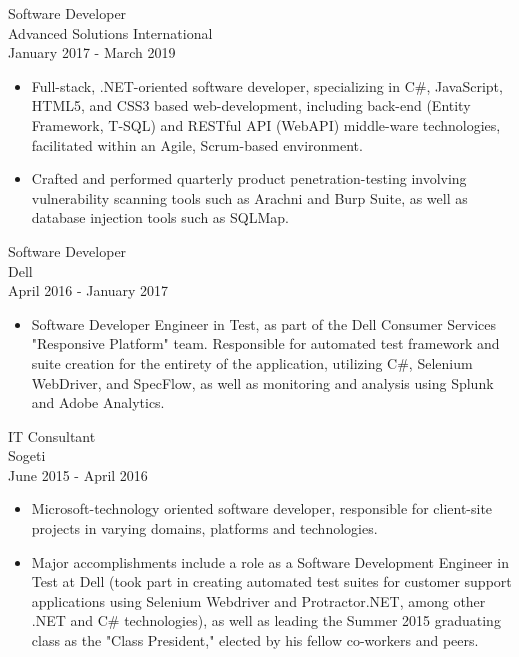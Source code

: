 \documentclass[11pt]{res} %
\begin{document}
\begin{resume}
Software Developer \\
Advanced Solutions International \\
January 2017 - March 2019
\vspace{0.2in}
   \begin{itemize} \itemsep -2pt  %
   \item Full-stack, .NET-oriented software developer, specializing in C\#, JavaScript, HTML5, and CSS3 based web-development, including back-end (Entity Framework, T-SQL) and RESTful API (WebAPI) middle-ware technologies, facilitated within an Agile, Scrum-based environment.
\newline
    \item Crafted and performed quarterly product penetration-testing involving vulnerability scanning tools such as Arachni and Burp Suite, as well as database injection tools such as SQLMap.
 \end{itemize}

 Software Developer \\
Dell \\
April 2016 - January 2017
\vspace{0.2in}
   \begin{itemize} \itemsep -2pt  %
   \item Software Developer Engineer in Test, as part of the Dell Consumer Services "Responsive Platform" team. Responsible for automated test framework and suite creation for the entirety of the application, utilizing C\#, Selenium WebDriver, and SpecFlow, as well as monitoring and analysis using Splunk and Adobe Analytics.
 \end{itemize}
 
 
IT Consultant \\
Sogeti \\
June 2015 - April 2016
\vspace{0.2in}
   \begin{itemize} \itemsep -2pt  %
   \item Microsoft-technology oriented software developer, responsible for client-site projects in varying domains, platforms and technologies. 
\newline
   \item Major accomplishments include a role as a Software Development Engineer in Test at Dell (took part in creating automated test suites for customer support applications using Selenium Webdriver and Protractor.NET, among other .NET and C\# technologies), as well as leading the Summer 2015 graduating class as the "Class President," elected by his fellow co-workers and peers.
 \end{itemize}


\end{resume}
\end{document}
